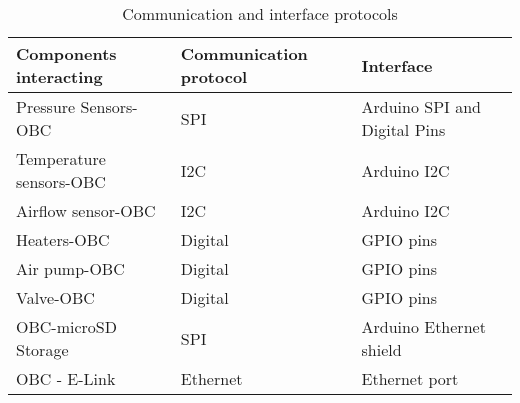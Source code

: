 \begin{table}[H]
\centering
\begin{tabular}{lll}
Components interacting & Communication protocol & Interface                 \\ \hline
Pressure Sensors-OBC   & SPI                    & Arduino SPI and Digital Pins \\
Temperature sensors-OBC        & I2C                    & Arduino I2C \\
Airflow sensor-OBC     & I2C                    & Arduino I2C \\
Heaters-OBC            & Digital                & GPIO pins \\
Air pump-OBC           & Digital                & GPIO pins \\
Valve-OBC              & Digital                & GPIO pins                 \\
OBC-microSD Storage    & SPI                    & Arduino Ethernet shield   \\
OBC - E-Link           & Ethernet               & Ethernet port            
\end{tabular}%
\caption{Communication and interface protocols}
\label{tab:comIntpro}
\end{table}